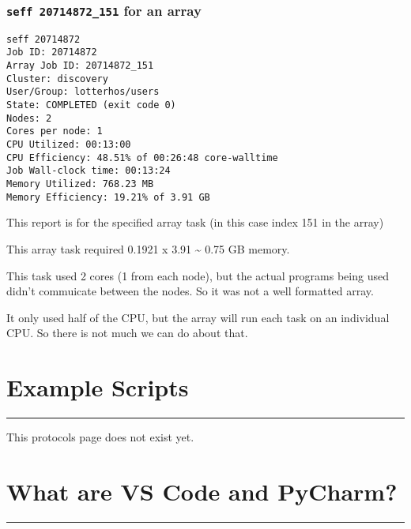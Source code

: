 \documentclass[
  letterpaper,
  DIV=11,
  numbers=noendperiod]{scrreprt}
\begin{document}
\hypertarget{seff-20714872_151-for-an-array}{%
\subsection*{\texorpdfstring{\textbf{\texttt{seff\ 20714872\_151} for an
array}}{seff 20714872\_151 for an array}}\label{seff-20714872_151-for-an-array}}

\begin{verbatim}
seff 20714872
Job ID: 20714872
Array Job ID: 20714872_151
Cluster: discovery
User/Group: lotterhos/users
State: COMPLETED (exit code 0)
Nodes: 2
Cores per node: 1
CPU Utilized: 00:13:00
CPU Efficiency: 48.51% of 00:26:48 core-walltime
Job Wall-clock time: 00:13:24
Memory Utilized: 768.23 MB
Memory Efficiency: 19.21% of 3.91 GB
\end{verbatim}

This report is for the specified array task (in this case index 151 in
the array)

This array task required 0.1921 x 3.91 \textasciitilde{} 0.75 GB memory.

This task used 2 cores (1 from each node), but the actual programs being
used didn't commuicate between the nodes. So it was not a well formatted
array.

It only used half of the CPU, but the array will run each task on an
individual CPU. So there is not much we can do about that.

\hypertarget{example-scripts}{%
\chapter{Example Scripts}\label{example-scripts}}

\begin{center}\rule{0.5\linewidth}{0.5pt}\end{center}

This protocols page does not exist yet.

\hypertarget{what-are-vs-code-and-pycharm}{%
\chapter{What are VS Code and
PyCharm?}\label{what-are-vs-code-and-pycharm}}

\begin{center}\rule{0.5\linewidth}{0.5pt}\end{center}
\end{document}
